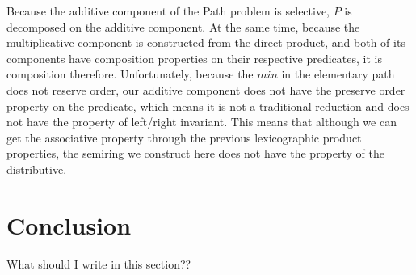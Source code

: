\documentclass[a4paper,10pt]{article}
\begin{document}
Because the additive component of the Path problem is selective, $P$ is decomposed on the additive component.
At the same time, because the multiplicative component is constructed from the direct product, and both of its components have composition properties on their respective predicates, it is composition therefore.
Unfortunately, because the $min$ in the elementary path does not reserve order, our additive component does not have the preserve order property on the predicate, which means it is not a traditional reduction and does not have the property of left/right invariant. This means that although we can get the associative property through the previous lexicographic product properties, the semiring we construct here does not have the property of the distributive.
\section{Conclusion}
What should I write in this section??
\medskip

 

\end{document}
